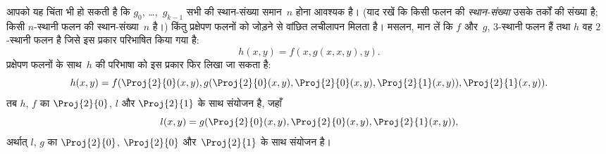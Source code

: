 \documentclass[../../../include/open-logic-section]{subfiles}
\begin{document}
आपको यह चिंता भी हो सकती है कि $g_0$, \dots,~$g_{k-1}$ सभी की
स्थान-संख्या समान~$n$ होना आवश्यक है। (याद रखें कि किसी फलन की
\emph{स्थान-संख्या} उसके तर्कों की संख्या है; किसी $n$-स्थानी फलन की
स्थान-संख्या~$n$ है।) किंतु प्रक्षेपण फलनों को जोड़ने से वांछित लचीलापन
मिलता है। मसलन, मान लें कि $f$ और~$g$, $3$-स्थानी फलन हैं तथा $h$ वह
$2$-स्थानी फलन है जिसे इस प्रकार परिभाषित किया गया है:
\[
h(x,y) = f(x,g(x,x,y),y).
\]
प्रक्षेपण फलनों के साथ~$h$ की परिभाषा को इस प्रकार फिर लिखा जा सकता है:
\[
h(x,y) = f(\Proj{2}{0}(x,y), g(\Proj{2}{0}(x,y), \Proj{2}{0}(x,y),
\Proj{2}{1}(x,y)), \Proj{2}{1}(x,y)).
\]
तब $h$, $f$ का $\Proj{2}{0}$, $l$ और $\Proj{2}{1}$ के साथ संयोजन है, जहाँ
\[
l(x,y) = g(\Proj{2}{0}(x,y),\Proj{2}{0}(x,y),\Proj{2}{1}(x,y)),
\]
अर्थात् $l$, $g$ का $\Proj{2}{0}$, $\Proj{2}{0}$ और~$\Proj{2}{1}$ के
साथ संयोजन है।
\end{document}
